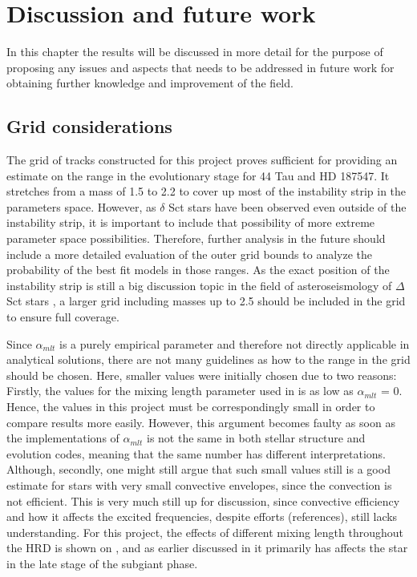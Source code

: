 \chapter{Discussion and future work}
\label{sec:discussion}

In this chapter the results will be discussed in more detail for the purpose of proposing any issues and aspects that needs to be addressed in future work for obtaining further knowledge and improvement of the field. 

\section{Grid considerations}

The grid of tracks constructed for this project proves sufficient for providing an estimate on the range in the evolutionary stage for 44 Tau and HD 187547. It stretches from a mass of 1.5 to 2.2 \msun to cover up most of the instability strip in the parameters space. However, as $\delta$ Sct stars have been observed even outside of the instability strip, it is important to include that possibility of more extreme parameter space possibilities. Therefore, further analysis in the future should include a more detailed evaluation of the outer grid bounds to analyze the probability of the best fit models in those ranges. As the exact position of the instability strip is still a big discussion topic in the field of asteroseismology of $\Delta$ Sct stars \citep{murphy2019gaia}, a larger grid including masses up to 2.5 \msun should be included in the grid to ensure full coverage. 

Since $\alpha_{mlt}$ is a purely empirical parameter and therefore not directly applicable in analytical solutions, there are not many guidelines as how to the range in the grid should be chosen. Here, smaller values were initially chosen due to two reasons: Firstly, the values for the mixing length parameter used in \citet{lenz2010delta} is as low as $\alpha_{mlt}$ = 0. Hence, the values in this project must be correspondingly small in order to compare results more easily. However, this argument becomes faulty as soon as the implementations of $\alpha_{mlt}$ is not the same in both stellar structure and evolution codes, meaning that the same number has different interpretations. Although, secondly, one might still argue that such small values still is a good estimate for stars with very small convective envelopes, since the convection is not efficient. This is very much still up for discussion, since convective efficiency and how it affects the excited frequencies, despite efforts (references), still lacks understanding. For this project, the effects of different mixing length throughout the HRD is shown on , and as earlier discussed in  it primarily has affects the star in the late stage of the subgiant phase. 

